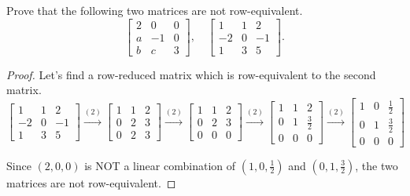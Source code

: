 \begin{exercise}
    Prove that the following two matrices are not row-equivalent.
    \[
        \begin{bmatrix}
            2 & 0  & 0 \\
            a & -1 & 0 \\
            b & c  & 3
        \end{bmatrix},\quad
        \begin{bmatrix}
            1  & 1 & 2  \\
            -2 & 0 & -1 \\
            1  & 3 & 5
        \end{bmatrix}.
    \]
\end{exercise}

\begin{proof}
    Let's find a row-reduced matrix which is row-equivalent to the second matrix.
    \[
        \begin{bmatrix}
            1  & 1 & 2  \\
            -2 & 0 & -1 \\
            1  & 3 & 5
        \end{bmatrix}
        \stackrel{(2)}{\rightarrow}
        \begin{bmatrix}
            1 & 1 & 2 \\
            0 & 2 & 3 \\
            0 & 2 & 3
        \end{bmatrix}
        \stackrel{(2)}{\rightarrow}
        \begin{bmatrix}
            1 & 1 & 2 \\
            0 & 2 & 3 \\
            0 & 0 & 0
        \end{bmatrix}
        \stackrel{(2)}{\rightarrow}
        \begin{bmatrix}
            1 & 1 & 2           \\
            0 & 1 & \frac{3}{2} \\
            0 & 0 & 0
        \end{bmatrix}
        \stackrel{(2)}{\rightarrow}
        \begin{bmatrix}
            1 & 0 & \frac{1}{2} \\
            0 & 1 & \frac{3}{2} \\
            0 & 0 & 0
        \end{bmatrix}
    \]

    Since $(2, 0, 0)$ is NOT a linear combination of $(1, 0, \frac{1}{2})$ and $(0, 1, \frac{3}{2})$, the two matrices are not row-equivalent.
\end{proof}

